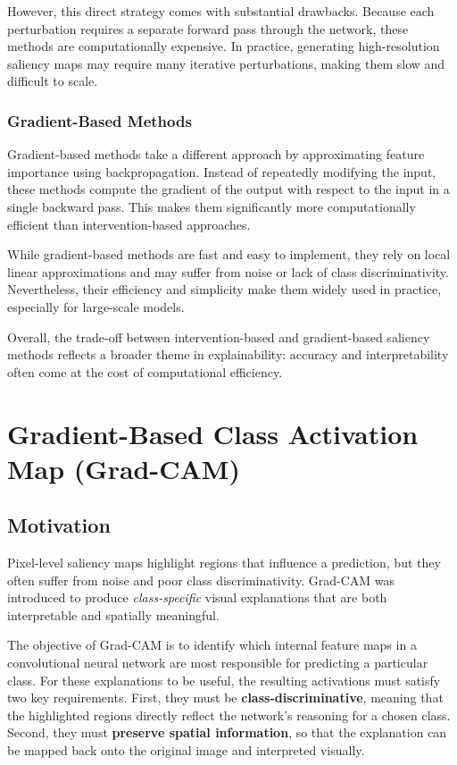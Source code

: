 \documentclass{article}
\begin{document}
However, this direct strategy comes with substantial drawbacks. Because each perturbation requires a separate forward pass through the network, these methods are computationally expensive. In practice, generating high-resolution saliency maps may require many iterative perturbations, making them slow and difficult to scale.

\subsubsection*{Gradient-Based Methods}

Gradient-based methods take a different approach by approximating feature importance using backpropagation. Instead of repeatedly modifying the input, these methods compute the gradient of the output with respect to the input in a single backward pass. This makes them significantly more computationally efficient than intervention-based approaches.

While gradient-based methods are fast and easy to implement, they rely on local linear approximations and may suffer from noise or lack of class discriminativity. Nevertheless, their efficiency and simplicity make them widely used in practice, especially for large-scale models.

Overall, the trade-off between intervention-based and gradient-based saliency methods reflects a broader theme in explainability: accuracy and interpretability often come at the cost of computational efficiency.

\section{Gradient-Based Class Activation Map (Grad-CAM)}

\subsection{Motivation}

Pixel-level saliency maps highlight regions that influence a prediction, but
they often suffer from noise and poor class discriminativity. Grad-CAM was
introduced to produce \emph{class-specific} visual explanations that are both
interpretable and spatially meaningful.

The objective of Grad-CAM is to identify which internal feature maps in a
convolutional neural network are most responsible for predicting a particular
class. For these explanations to be useful, the resulting activations must
satisfy two key requirements. First, they must be \textbf{class-discriminative},
meaning that the highlighted regions directly reflect the network’s reasoning
for a chosen class. Second, they must \textbf{preserve spatial information}, so
that the explanation can be mapped back onto the original image and interpreted
visually.
\end{document}
